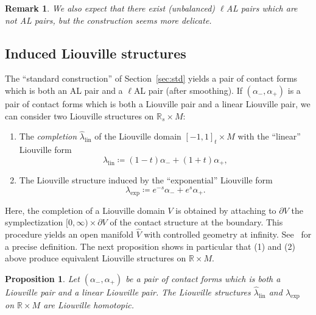 \documentclass[letterpaper, 11pt]{article}
\numberwithin{equation}{section}
\newtheorem{prop}[thm]{Proposition}
\newtheorem{rem}[thm]{Remark}
\newcommand{\R}{\mathbb{R}}
\begin{document}
\begin{rem}
We also expect that there exist (unbalanced) $\ell$AL pairs which are not AL pairs, but the construction seems more delicate.
\end{rem}

        \subsection{Induced Liouville structures}

The ``standard construction'' of Section~\ref{sec:std} yields a pair of contact forms which is both an AL pair and a $\ell$AL pair (after smoothing). If $(\alpha_-, \alpha_+)$ is a pair of contact forms which is both a Liouville pair and a linear Liouville pair, we can consider two Liouville structures on $\R_s \times M$:
\begin{enumerate}[label=(\arabic*)]
    \item The \emph{completion} $\widehat{\lambda}_\mathrm{lin}$ of the Liouville domain $[-1,1]_t \times M$ with the ``linear'' Liouville form $$\lambda_\mathrm{lin} \coloneqq (1-t) \alpha_- + (1+t) \alpha_+,$$
    \item The Liouville structure induced by the ``exponential'' Liouville form $$\lambda_\mathrm{exp} \coloneqq e^{-s} \alpha_- + e^s \alpha_+.$$
\end{enumerate}

Here, the completion of a Liouville domain $V$ is obtained by attaching to $\partial V$ the symplectization $[0, \infty) \times \partial V$ of the contact structure at the boundary. This procedure yields an open manifold $\widehat{V}$ with controlled geometry at infinity. See~\cite[Section 11.1]{CE12} for a precise definition. The next proposition shows in particular that (1) and (2) above produce equivalent Liouville structures on $\R \times M$.

\begin{prop} \label{prop:sameliouv}
Let $(\alpha_-, \alpha_+)$ be a pair of contact forms which is both a Liouville pair and a linear Liouville pair. The Liouville structures $\widehat{\lambda}_\mathrm{lin}$ and $\lambda_\mathrm{exp}$ on $\R \times M$ are Liouville homotopic.
\end{prop}
\end{document}

